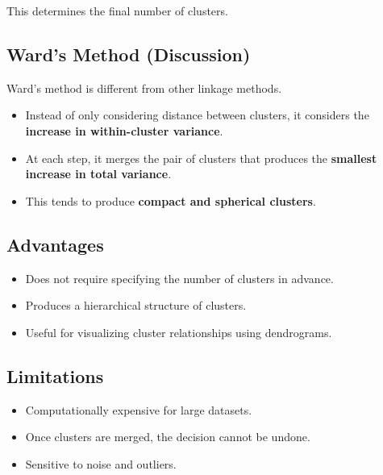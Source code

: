 \documentclass[10pt,a4paper]{article}
\begin{document}
	This determines the final number of clusters.

	\subsection{Ward's Method (Discussion)}

	Ward’s method is different from other linkage methods.

	\begin{itemize}

		\item Instead of only considering distance between clusters, it considers the \textbf{increase in within-cluster variance}.

		\item At each step, it merges the pair of clusters that produces the \textbf{smallest increase in total variance}.

		\item This tends to produce \textbf{compact and spherical clusters}.

	\end{itemize}

	\subsection{Advantages}

	\begin{itemize}

		\item Does not require specifying the number of clusters in advance.
		\item Produces a hierarchical structure of clusters.
		\item Useful for visualizing cluster relationships using dendrograms.

	\end{itemize}

	\subsection{Limitations}

	\begin{itemize}

		\item Computationally expensive for large datasets.
		\item Once clusters are merged, the decision cannot be undone.
		\item Sensitive to noise and outliers.

	\end{itemize}
\end{document}

